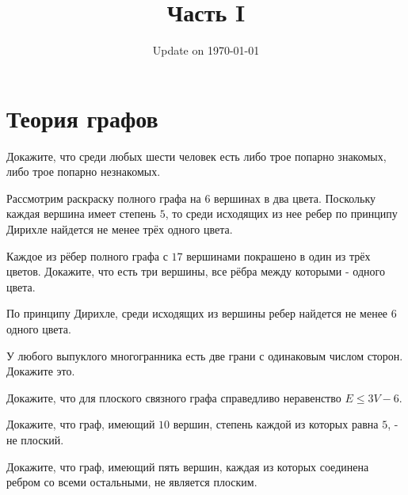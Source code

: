\documentclass[12pt]{book}
\begin{document}
\pagestyle{empty}

\fontsize{12}{12}\selectfont

\title{\bf \huge Часть I}
\date{Update on \today}
\maketitle 

\chapter{Теория графов}

\begin{task}
Докажите, что среди любых шести человек есть либо трое попарно знакомых, либо трое попарно незнакомых.
\end{task}

\begin{solution}
Рассмотрим раскраску полного графа на $6$ вершинах в два цвета. Поскольку каждая вершина имеет степень $5$, то среди исходящих из нее ребер по принципу Дирихле найдется не менее трёх одного цвета. 
\end{solution}

\begin{task}
Каждое из рёбер полного графа с $17$ вершинами покрашено в один из трёх цветов. Докажите, что есть три вершины, все рёбра между которыми - одного цвета.
\end{task}

\begin{solution}
По принципу Дирихле, среди исходящих из вершины ребер найдется не менее $6$ одного цвета. 
\end{solution}

\begin{task}
У любого выпуклого многогранника есть две грани с одинаковым числом сторон. Докажите это.
\end{task}

\begin{task}
Докажите, что для плоского связного графа справедливо неравенство  $E \leqslant  3V - 6$.
\end{task}

\begin{task}
Докажите, что граф, имеющий $10$ вершин, степень каждой из которых равна $5$, - не плоский.    
\end{task}

\begin{task}
Докажите, что граф, имеющий пять вершин, каждая из которых соединена ребром со всеми остальными, не является плоским.
\end{task}
\end{document}

